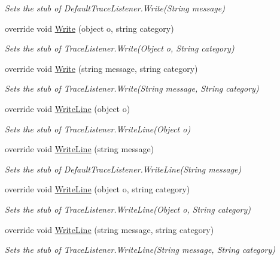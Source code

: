 \begin{DoxyCompactItemize}
\begin{DoxyCompactList}\small\item\em Sets the stub of Default\-Trace\-Listener.\-Write(\-String message)\end{DoxyCompactList}\item 
override void \hyperlink{class_system_1_1_diagnostics_1_1_fakes_1_1_stub_default_trace_listener_a7ec0c32fcdf95c936e111e268448cc8f}{Write} (object o, string category)
\begin{DoxyCompactList}\small\item\em Sets the stub of Trace\-Listener.\-Write(\-Object o, String category)\end{DoxyCompactList}\item 
override void \hyperlink{class_system_1_1_diagnostics_1_1_fakes_1_1_stub_default_trace_listener_af3d9979603c95d520446e95809dbebca}{Write} (string message, string category)
\begin{DoxyCompactList}\small\item\em Sets the stub of Trace\-Listener.\-Write(\-String message, String category)\end{DoxyCompactList}\item 
override void \hyperlink{class_system_1_1_diagnostics_1_1_fakes_1_1_stub_default_trace_listener_a515e27247b065c221c881c2de0b2846d}{Write\-Line} (object o)
\begin{DoxyCompactList}\small\item\em Sets the stub of Trace\-Listener.\-Write\-Line(\-Object o)\end{DoxyCompactList}\item 
override void \hyperlink{class_system_1_1_diagnostics_1_1_fakes_1_1_stub_default_trace_listener_a9b6400d018d5ad3c55b8067087fb42e7}{Write\-Line} (string message)
\begin{DoxyCompactList}\small\item\em Sets the stub of Default\-Trace\-Listener.\-Write\-Line(\-String message)\end{DoxyCompactList}\item 
override void \hyperlink{class_system_1_1_diagnostics_1_1_fakes_1_1_stub_default_trace_listener_a56490102fb3d206ce1952326a81f522c}{Write\-Line} (object o, string category)
\begin{DoxyCompactList}\small\item\em Sets the stub of Trace\-Listener.\-Write\-Line(\-Object o, String category)\end{DoxyCompactList}\item 
override void \hyperlink{class_system_1_1_diagnostics_1_1_fakes_1_1_stub_default_trace_listener_aee7e6611f132da78f6b53dee1242b28d}{Write\-Line} (string message, string category)
\begin{DoxyCompactList}\small\item\em Sets the stub of Trace\-Listener.\-Write\-Line(\-String message, String category)\end{DoxyCompactList}\end{DoxyCompactItemize}
